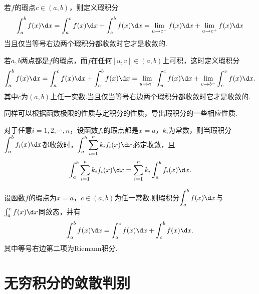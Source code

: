 若$f$的瑕点$c\in(a,b)$，则定义瑕积分
$$\int_{a}^{b}f(x)\d x=\int_{a}^{c}f(x)\d x+\int_{c}^{b}f(x)\d x=\lim\limits_{u\to c^-}f(x)\d x+\lim\limits_{u\to c^+}f(x)\d x$$
当且仅当等号右边两个瑕积分都收敛时它才是收敛的.

若$a,b$两点都是$f$的瑕点，而$f$在任何$\left[u,v\right]\in\left(a,b\right)$上可积，这时定义瑕积分
$$\int_{a}^{b}f(x)\d x=\int_{a}^{c}f(x)\d x+\int_{c}^{b}f(x)\d x=\lim\limits_{u\to a^+}\int_{u}^{c}f(x)\d x+\lim\limits_{v\to b^-}\int_{c}^{v}f(x)\d x.$$
其中$c$为$(a,b)$上任一实数.当且仅当等号右边两个瑕积分都收敛时它才是收敛的.

同样可以根据函数极限的性质与定积分的性质，导出瑕积分的一些相应性质.
\begin{proposition}
	对于任意$i=1,2,\cdots,n$，设函数$f_i$的瑕点都是$x=a$，$k_i$为常数，则当瑕积分$\displaystyle\int_{a}^{b}f_i(x)\d x$都收敛时，$\displaystyle\int_{a}^{b}\displaystyle\sum_{i=1}^{n}k_if_i(x)\d x$必定收敛，且
	$$\int_{a}^{b}\sum_{i=1}^{n}k_if_i(x)\d x=\sum_{i=1}^{n}k_i\int_{a}^{b}f_i(x)\d x.$$
\end{proposition}
\begin{proposition}
	设函数$f$的瑕点为$x=a$，$c\in(a,b)$为任一常数.则瑕积分$\displaystyle\int_{a}^{b}f(x)\d x$与$\int_{a}^{c}f(x)\d x$同敛态，并有
	$$\int_{a}^{b}f(x)\d x=\int_{a}^{c}f(x)\d x+\int_{c}^{b}f(x)\d x.$$
	其中等号右边第二项为Riemann积分.
\end{proposition}
\section{无穷积分的敛散判别}
